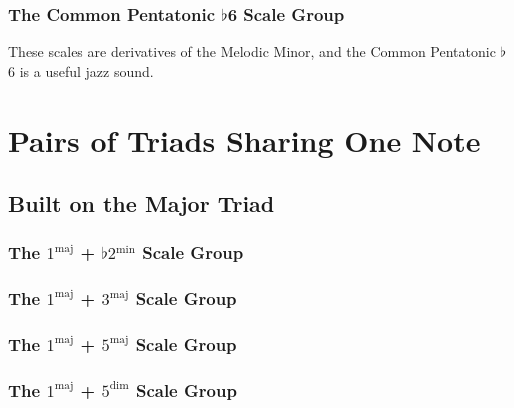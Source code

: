 \documentclass[english]{./gbook}
\begin{document}
\begin{large}
\subsubsection{The Common Pentatonic $\flat$6 Scale Group}
These scales are derivatives of the Melodic Minor, and the Common Pentatonic $\flat$6 is a useful jazz sound. 

\section{Pairs of Triads Sharing One Note}

\subsection{Built on the Major Triad}

\subsubsection{The $1^{\text{maj}}$ + $\flat 2^{\text{min}}$ Scale Group}

\subsubsection{The $1^{\text{maj}}$ + $3^{\text{maj}}$ Scale Group}

\subsubsection{The $1^{\text{maj}}$ + $5^{\text{maj}}$ Scale Group}

\subsubsection{The $1^{\text{maj}}$ + $5^{\text{dim}}$ Scale Group}


\end{large}
\end{document}
